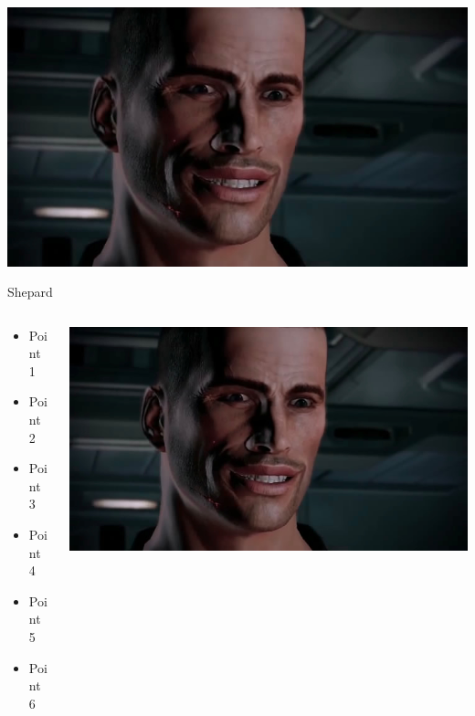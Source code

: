 \documentclass{beamer}
\begin{document}
\begin{frame}
	\begin{center}
		\includegraphics[width=\textwidth]{shepard}
	\end{center}
\end{frame}

\begin{frame}{Shepard}
	\begin{columns}
		\begin{column}{0.27\textwidth}
			\begin{itemize}
				\item Point 1 \pause
				\item Point 2 \pause
				\item Point 3 \pause
				\item Point 4 \pause
				\item Point 5 \pause
				\item Point 6 \pause
			\end{itemize}
		\end{column}
		\begin{column}{0.67\textwidth}
			\begin{center}
				\includegraphics[width=\textwidth]{shepard}
			\end{center}
		\end{column}
	\end{columns}
\end{frame}
\end{document}
